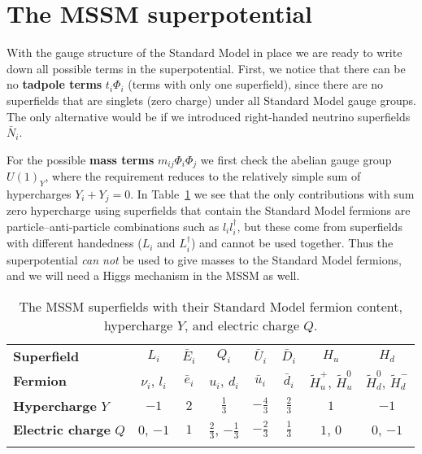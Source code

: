 \documentclass[notes.tex]{subfiles}
\begin{document}
\section{The MSSM superpotential}
With the gauge structure of the Standard Model  in place we are ready to write down all possible terms in the superpotential. First, we notice that there can be no {\bf tadpole terms} $t_i\Phi_i$ (terms with only one superfield), since there are no superfields that are singlets (zero charge) under all Standard Model gauge groups. The only alternative would be if we introduced right-handed neutrino superfields $\bar{N}_i$. 

For the possible {\bf mass terms} $m_{ij}\Phi_i\Phi_j$ we first check the abelian gauge group $U(1)_Y$, where the requirement reduces to the relatively simple sum of hypercharges $Y_i + Y_j = 0$. In Table~\ref{tab:hyper} we see that the only contributions  with sum zero hypercharge using  superfields that contain the Standard Model fermions are particle--anti-particle combinations such as $l_i l_i^\dagger$, but these come from superfields with different handedness ($L_i$ and $L_i^\dagger$) and cannot be used together. Thus the superpotential {\it can not} be used to give masses to the Standard Model fermions, and we will need a Higgs mechanism in the MSSM as well.

\begin{table}[h]
\begin{center}
\begin{tabular}{l | c | c | c | c | c | c | c  } 
\noalign{\smallskip}\hline\noalign{\smallskip}
{\bf Superfield} & $L_i$ & $\bar{E}_i$ & $Q_i$ & $\bar{U}_i$ & $\bar{D}_i$ & $H_u$ & $H_d$  \\
\noalign{\smallskip}\hline\noalign{\smallskip} 
{\bf Fermion}    & $\nu_i$, $l_i$ & $\bar e_i$ & $u_i$, $d_i$ & $\bar u_i$ & $\bar d_i$ & $\tilde H_u^+$, $\tilde H_u^0$ & $\tilde H_d^0$, $\tilde H_d^-$ \\
{\bf Hypercharge} $Y$ & $-1$ & $2$ & $\frac{1}{3}$ & $-\frac{4}{3}$ & $\frac{2}{3}$ & $1$ & $-1$ \\
{\bf Electric charge} $Q$ & $0$, $-1$ & $1$ & $\frac{2}{3}$, $-\frac{1}{3}$ & $-\frac{2}{3}$ & $\frac{1}{3}$ & $1$, $0$ & $0$, $-1$ \\
\noalign{\smallskip}\hline\noalign{\smallskip}
\end{tabular}
\caption{The MSSM superfields with their Standard Model fermion content, hypercharge $Y$, and electric charge $Q$.}
\label{tab:hyper}
\end{center}
\end{table}
\end{document}
